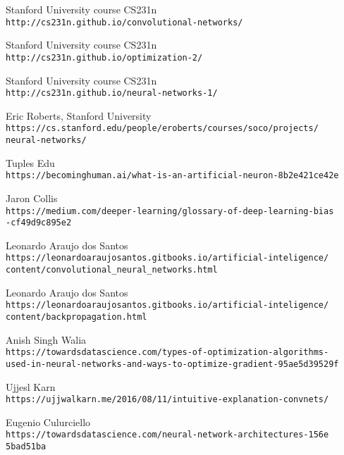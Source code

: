 \begin{thebibliography}{99}

Stanford University course CS231n
\\\texttt{http://cs231n.github.io/convolutional-networks/}

Stanford University course CS231n
\\\texttt{http://cs231n.github.io/optimization-2/}

Stanford University course CS231n
\\\texttt{http://cs231n.github.io/neural-networks-1/}

Eric Roberts, Stanford University
\\\texttt{https://cs.stanford.edu/people/eroberts/courses/soco/projects/\\neural-networks/}

Tuples Edu
\\\texttt{https://becominghuman.ai/what-is-an-artificial-neuron-8b2e421ce42e}

Jaron Collis
\\\texttt{https://medium.com/deeper-learning/glossary-of-deep-learning-bias\\-cf49d9c895e2}

Leonardo Araujo dos Santos
\\\texttt{https://leonardoaraujosantos.gitbooks.io/artificial-inteligence/\\content/convolutional\_neural\_networks.html}

Leonardo Araujo dos Santos
\\\texttt{https://leonardoaraujosantos.gitbooks.io/artificial-inteligence/\\content/backpropagation.html}

Anish Singh Walia
\\\texttt{https://towardsdatascience.com/types-of-optimization-algorithms-\\used-in-neural-networks-and-ways-to-optimize-gradient-95ae5d39529f}

Ujjesl Karn
\\\texttt{https://ujjwalkarn.me/2016/08/11/intuitive-explanation-convnets/}

Eugenio Culurciello
\\\texttt{https://towardsdatascience.com/neural-network-architectures-156e\\5bad51ba}


\end{thebibliography}
